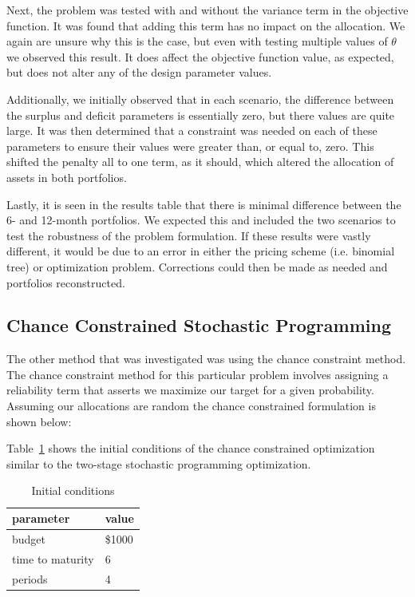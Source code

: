 \documentclass[12pt]{article}
\begin{document}
	Next, the problem was tested with and without the variance term in the objective function. It was found that adding this term has no impact on the allocation. We again are unsure why this is the case, but even with testing multiple values of $\theta$ we observed this result. It does affect the objective function value, as expected, but does not alter any of the design parameter values.
	
	Additionally, we initially observed that in each scenario, the difference between the surplus and deficit parameters is essentially zero, but there values are quite large. It was then determined that a constraint was needed on each of these parameters to ensure their values were greater than, or equal to, zero. This shifted the penalty all to one term, as it should, which altered the allocation of assets in both portfolios.
	
	Lastly, it is seen in the results table that there is minimal difference between the 6- and 12-month portfolios. We expected this and included the two scenarios to test the robustness of the problem formulation. If these results were vastly different, it would be due to an error in either the pricing scheme (i.e. binomial tree) or optimization problem. Corrections could then be made as needed and portfolios reconstructed.

\subsection{Chance Constrained Stochastic Programming}
The other method that was investigated was using the chance constraint method. The chance constraint method for this particular problem involves assigning a reliability term that asserts we maximize our target for a given probability. Assuming our allocations are random the chance constrained formulation is shown below:

Table~\ref{tab:init_cond2} shows the initial conditions of the chance constrained optimization similar to the two-stage stochastic programming optimization.

\begin{table}[H]
	\centering
\begin{tabular}{|l|l|}
\hline
	\textbf{parameter} & \textbf{value} \\ \hline
	budget & \$1000 \\ \hline
	time to maturity & 6\\ \hline
	periods & 4 \\ \hline
\end{tabular}
\caption {Initial conditions}
\label{tab:init_cond2}
\end{table}
\end{document}
